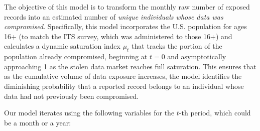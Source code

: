 
The objective of this model is to transform the monthly raw number of exposed records into an estimated number of {\em unique individuals whose data was compromised}. Specifically, this model incorporates the U.S. population for ages 16+ (to match the ITS survey, which was administered to those 16+) and calculates a dynamic saturation index $\mu_t$ that tracks the portion of the population already compromised, beginning at $t=0$ and asymptotically approaching 1 as the stolen data market reaches full saturation. This ensures that as the cumulative volume of data exposure increases, the model identifies the diminishing probability that a reported record belongs to an individual whose data had not previously been compromised. 

Our model iterates using the following variables for the $t$-th period, which could be a month or a year: %


